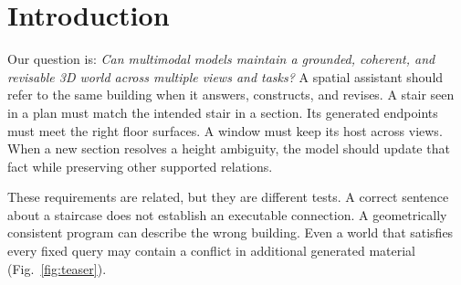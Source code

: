 

\begin{abstract}
Multimodal models can answer spatial questions without producing a coherent
executable world. We introduce \tw{}, an evaluation of whether models
construct and maintain grounded, geometrically consistent, and revisable
worlds from multiple architectural drawings. It contains 14 buildings,
42 drawing pages, 95 determinate relations, and one unresolved identity
relation. We compare direct answering, independent world construction, and
construction assisted by correct relations. Across eight GPT product
configurations, the 12-building point-anchored condition yields 98.17\%
answer accuracy and 88.50\% world-readout accuracy. Among jointly
contract-valid opportunities, answering alone is correct in 34 cases and
construction alone in five. Correct relations rescue 29 construction errors
but introduce 11. Qwen largely aligns answering and construction in N2,
while complex stairs expose interface failures. We also measure grounding,
material consistency, and evidence withdrawal. Spatial answering,
executable construction, and world maintenance require separate measurements.
\end{abstract}

\section{Introduction}
\label{sec:intro}
Our question is: \emph{Can multimodal models maintain a grounded,
coherent, and revisable 3D world across multiple views and tasks?}
A spatial assistant should refer to the same building when it answers,
constructs, and revises. A stair seen in a plan must match the intended
stair in a section. Its generated endpoints must meet the right floor
surfaces. A window must keep its host across views. When a new section
resolves a height ambiguity, the model should update that fact while
preserving other supported relations.

These requirements are related, but they are different tests. A correct
sentence about a staircase does not establish an executable connection.
A geometrically consistent program can describe the wrong building.
Even a world that satisfies every fixed query may contain a conflict in
additional generated material (Fig.~\ref{fig:teaser}).
